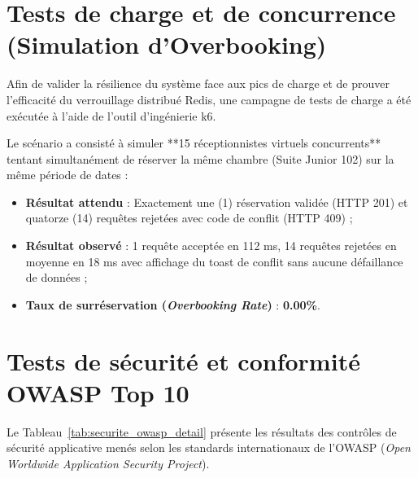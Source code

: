 \section{Tests de charge et de concurrence (Simulation d'Overbooking)}

Afin de valider la résilience du système face aux pics de charge et de prouver l'efficacité du verrouillage distribué Redis, une campagne de tests de charge a été exécutée à l'aide de l'outil d'ingénierie k6.

Le scénario a consisté à simuler **15 réceptionnistes virtuels concurrents** tentant simultanément de réserver la même chambre (Suite Junior 102) sur la même période de dates :
\begin{itemize}
    \item \textbf{Résultat attendu} : Exactement une (1) réservation validée (HTTP 201) et quatorze (14) requêtes rejetées avec code de conflit (HTTP 409) ;
    \item \textbf{Résultat observé} : 1 requête acceptée en 112 ms, 14 requêtes rejetées en moyenne en 18 ms avec affichage du toast de conflit sans aucune défaillance de données ;
    \item \textbf{Taux de surréservation (\textit{Overbooking Rate})} : \textbf{0.00\%}.
\end{itemize}

\section{Tests de sécurité et conformité OWASP Top 10}

Le Tableau~\ref{tab:securite_owasp_detail} présente les résultats des contrôles de sécurité applicative menés selon les standards internationaux de l'OWASP (\textit{Open Worldwide Application Security Project}).

